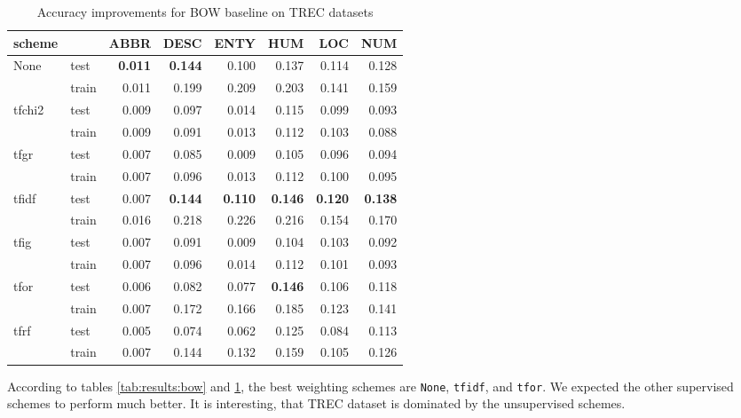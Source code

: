 \begin{table}[H]
\begin{center}

\begin{tabular}{llrrrrrr}
\toprule
scheme &&  ABBR &  DESC &  ENTY &  HUM &  LOC &  NUM \\

\midrule
None & test & \textbf{0.011} & \textbf{0.144} & 0.100 &0.137 &0.114 &0.128 \\
{} & train & 0.011 & 0.199 & 0.209 &0.203 &0.141 &0.159 \\
tfchi2 & test & 0.009 & 0.097 & 0.014 &0.115 &0.099 &0.093 \\
{} & train & 0.009 & 0.091 & 0.013 &0.112 &0.103 &0.088 \\
tfgr & test & 0.007 & 0.085 & 0.009 &0.105 &0.096 &0.094 \\
{} & train & 0.007 & 0.096 & 0.013 &0.112 &0.100 &0.095 \\
tfidf & test & 0.007 & \textbf{0.144} & \textbf{0.110} &\textbf{0.146} &\textbf{0.120} &\textbf{0.138} \\
{} & train & 0.016 & 0.218 & 0.226 &0.216 &0.154 &0.170 \\
tfig & test & 0.007 & 0.091 & 0.009 &0.104 &0.103 &0.092 \\
{} & train & 0.007 & 0.096 & 0.014 &0.112 &0.101 &0.093 \\
tfor & test & 0.006 & 0.082 & 0.077 &\textbf{0.146} &0.106 &0.118 \\
{} & train & 0.007 & 0.172 & 0.166 &0.185 &0.123 &0.141 \\
tfrf & test & 0.005 & 0.074 & 0.062 &0.125 &0.084 &0.113 \\
{} & train & 0.007 & 0.144 & 0.132 &0.159 &0.105 &0.126 \\
\bottomrule
\end{tabular}

\caption[Accuracy improvements for BOW baseline on TREC datasets]{Accuracy improvements for BOW baseline on TREC datasets}
\label{tab:results:bow:trec}
\end{center}
\end{table}

    
    According to tables \ref{tab:results:bow} and \ref{tab:results:bow:trec}, 
    the best weighting schemes are \texttt{None}, \texttt{tfidf}, and \texttt{tfor}.
    We expected the other supervised schemes to perform much better.
    It is interesting, that TREC dataset is dominated by the unsupervised schemes.
    
